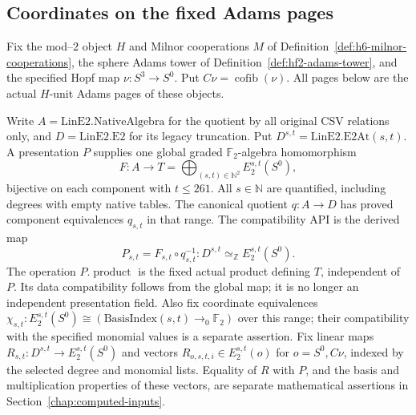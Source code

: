 \subsection{Coordinates on the fixed Adams pages}

\begin{definition}
  \label{def:computation-fixed-bindings}
  \notready
  Fix the mod--$2$ object $H$ and Milnor cooperations $M$ of
  Definition~\ref{def:h6-milnor-cooperations}, the sphere Adams tower
  of Definition~\ref{def:hf2-adams-tower}, and the specified Hopf map
  $\nu:S^3\to S^0$. Put
  $C\nu=\operatorname{cofib}(\nu)$. All pages below are the actual
  $H$-unit Adams pages of these objects.

  Write $A=\mathrm{LinE2.NativeAlgebra}$ for the quotient by all original
  CSV relations only, and $D=\mathrm{LinE2.E2}$ for its legacy truncation.
  Put $D^{s,t}=\mathrm{LinE2.E2At}(s,t)$. A presentation $P$ supplies
  one global graded $\mathbb F_2$-algebra homomorphism
  \[
    F:A\longrightarrow T=\bigoplus_{(s,t)\in\mathbb N^2}E_2^{s,t}(S^0),
  \]
  bijective on each component with $t\le261$. All $s\in\mathbb N$
  are quantified, including degrees with empty native tables.
  The canonical quotient $q:A\to D$ has proved component equivalences
  $q_{s,t}$ in that range. The compatibility API is the derived map
  \[
    P_{s,t}=F_{s,t}\circ q_{s,t}^{-1}:
      D^{s,t}\simeq_{\mathbb Z}E_2^{s,t}(S^0).
  \]
  The operation $P.\operatorname{product}$ is the fixed actual product
  defining $T$, independent of $P$. Its data compatibility follows from
  the global map; it is no longer an independent presentation field.
  Also fix coordinate equivalences
  $\chi_{s,t}:E_2^{s,t}(S^0)\cong
  (\mathrm{BasisIndex}(s,t)\to_0\mathbb F_2)$ over this range;
  their compatibility with the specified monomial values is a separate
  assertion. Fix linear maps
  $R_{s,t}:D^{s,t}\to E_2^{s,t}(S^0)$ and vectors
  $R_{o,s,t,i}\in E_2^{s,t}(o)$ for $o=S^0,C\nu$, indexed by the
  selected degree and monomial lists. Equality of $R$ with $P$, and the
  basis and multiplication properties of these vectors, are separate
  mathematical assertions in Section~\ref{chap:computed-inputs}.


\end{definition}
